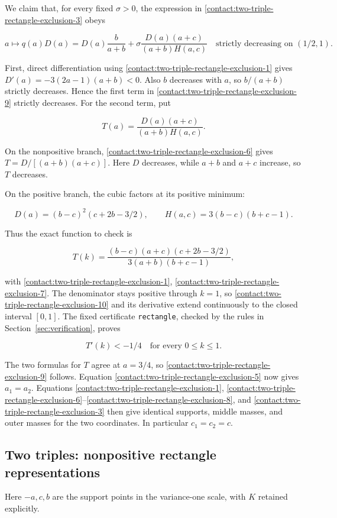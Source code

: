 We claim that, for every fixed $\sigma>0$, the expression in \eqref{contact:two-triple-rectangle-exclusion-3} obeys

\[
 a\longmapsto q(a)D(a)
 =D(a)\frac b{a+b}
  +\sigma\frac{D(a)(a+c)}{(a+b)H(a,c)}
 \quad\text{strictly decreasing on }(1/2,1).
\tag{B.6.9}\label{contact:two-triple-rectangle-exclusion-9}
\]

First, direct differentiation using \eqref{contact:two-triple-rectangle-exclusion-1} gives
$D'(a)=-3(2a-1)(a+b)<0$. Also $b$ decreases with $a$, so
$b/(a+b)$ strictly decreases. Hence the first term in \eqref{contact:two-triple-rectangle-exclusion-9} strictly
decreases. For the second term, put

\[
 T(a)=\frac{D(a)(a+c)}{(a+b)H(a,c)}.
\]

On the nonpositive branch, \eqref{contact:two-triple-rectangle-exclusion-6} gives $T=D/[(a+b)(a+c)]$.
Here $D$ decreases, while $a+b$ and $a+c$ increase, so $T$ decreases.

On the positive branch, the cubic factors at its positive minimum:

\[
 D(a)=(b-c)^2(c+2b-3/2),\qquad
 H(a,c)=3(b-c)(b+c-1).
\]

Thus the exact function to check is

\[
 T(k)=\frac{(b-c)(a+c)(c+2b-3/2)}
                  {3(a+b)(b+c-1)},
\tag{B.6.10}\label{contact:two-triple-rectangle-exclusion-10}
\]

with \eqref{contact:two-triple-rectangle-exclusion-1}, \eqref{contact:two-triple-rectangle-exclusion-7}. The denominator stays positive through $k=1$, so \eqref{contact:two-triple-rectangle-exclusion-10}
and its derivative extend continuously to the closed interval $[0,1]$.
The fixed certificate \texttt{rectangle}, checked by the rules in
Section~\ref{sec:verification}, proves

\[
 \boxed{\quad T'(k)<-1/4\quad\text{for every }0\leq k\leq1.\quad}
\tag{B.6.11}\label{contact:two-triple-rectangle-exclusion-11}
\]

The two formulas for $T$ agree at $a=3/4$, so \eqref{contact:two-triple-rectangle-exclusion-9} follows. Equation
\eqref{contact:two-triple-rectangle-exclusion-5} now gives $a_1=a_2$. Equations \eqref{contact:two-triple-rectangle-exclusion-1}, \eqref{contact:two-triple-rectangle-exclusion-6}--\eqref{contact:two-triple-rectangle-exclusion-8}, and \eqref{contact:two-triple-rectangle-exclusion-3} then give
identical supports, middle masses, and outer masses for the two
coordinates. In particular $c_1=c_2=c$.
\subsection{Two triples: nonpositive rectangle representations}\label{contact:two-triple-nonpositive-rectangle}
Here $-a,c,b$ are the support points in the variance-one scale, with $K$ retained explicitly.



